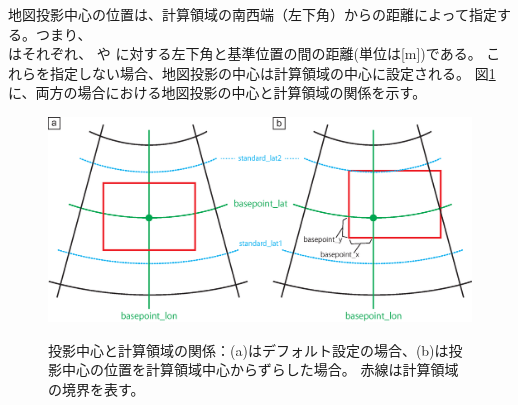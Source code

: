 \noindent
地図投影中心の位置は、計算領域の南西端（左下角）からの距離によって指定する。つまり、\\
はそれぞれ、
\XDIR や \YDIR に対する左下角と基準位置の間の距離(単位は[m])である。
これらを指定しない場合、地図投影の中心は計算領域の中心に設定される。
図\ref{fig:map_lc}に、両方の場合における地図投影の中心と計算領域の関係を示す。

\begin{figure}[t]
\begin{center}
  \includegraphics[width=0.8\hsize]{./figure/LC_latlon_xy.eps}\\
  \caption{投影中心と計算領域の関係：(a)はデフォルト設定の場合、(b)は投影中心の位置を計算領域中心からずらした場合。
  赤線は計算領域の境界を表す。}
  \label{fig:map_lc}
\end{center}
\end{figure}
